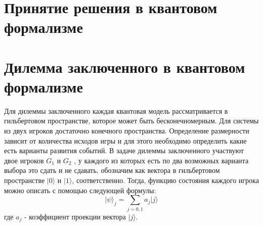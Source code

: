 \section{Принятие решения в квантовом формализме}

\section{Дилемма заключенного в квантовом формализме}

Для дилеммы заключенного каждая квантовая модель рассматривается в гильбертовом пространстве, которое
может быть бесконечномерным.
Для системы из двух игроков достаточно конечного пространства.
Определение размерности зависит от количества исходов игры и для этого необходимо определить какие
есть варианты развития событий.
В задаче дилеммы заключенного участвуют двое игроков $G_{1}$ и $G_{2}$ , у каждого из которых есть по два возможных
варианта выбора это сдать и не сдавать, обозначим как вектора в гильбертовом пространстве
$\vert 0 \rangle$ и $\vert 1 \rangle$, соответственно.
Тогда, функцию состояния каждого игрока можно описать с помощью следующей формулы:
\begin{equation}
    \vert \psi \rangle_{j} = \sum_{j=0,1} a_{j} \vert j \rangle
\end{equation}
где $a_{j}$ - коэффициент проекции вектора $\vert j \rangle$.


